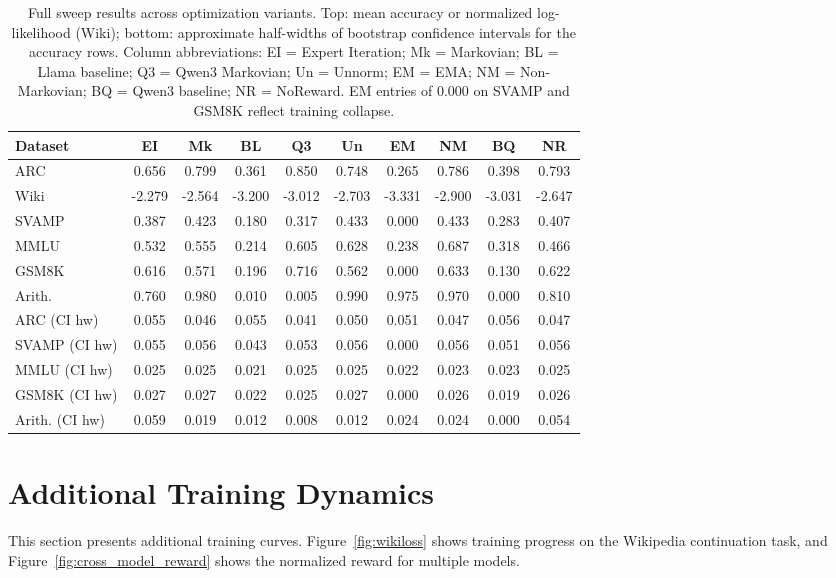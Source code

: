 \documentclass{article} %
\begin{document}
\begin{table}[ht]
    \centering
    \caption{Full sweep results across optimization variants. Top: mean accuracy or normalized log-likelihood (Wiki); bottom: approximate half-widths of bootstrap confidence intervals for the accuracy rows. Column abbreviations: EI = Expert Iteration; Mk = Markovian; BL = Llama baseline; Q3 = Qwen3 Markovian; Un = Unnorm; EM = EMA; NM = Non-Markovian; BQ = Qwen3 baseline; NR = NoReward. EM entries of 0.000 on SVAMP and GSM8K reflect training collapse.}
    \label{tab:full_sweep_results}
    \setlength{\tabcolsep}{3pt}
    \begin{tabular}{lccccccccc}
        \toprule
        \textbf{Dataset} & \textbf{EI} & \textbf{Mk} & \textbf{BL} & \textbf{Q3} & \textbf{Un} & \textbf{EM} & \textbf{NM} & \textbf{BQ} & \textbf{NR} \\
        \midrule
        ARC & 0.656 & 0.799 & 0.361 & 0.850 & 0.748 & 0.265 & 0.786 & 0.398 & 0.793 \\
        Wiki & -2.279 & -2.564 & -3.200 & -3.012 & -2.703 & -3.331 & -2.900 & -3.031 & -2.647 \\
        SVAMP & 0.387 & 0.423 & 0.180 & 0.317 & 0.433 & 0.000 & 0.433 & 0.283 & 0.407 \\
        MMLU & 0.532 & 0.555 & 0.214 & 0.605 & 0.628 & 0.238 & 0.687 & 0.318 & 0.466 \\
        GSM8K & 0.616 & 0.571 & 0.196 & 0.716 & 0.562 & 0.000 & 0.633 & 0.130 & 0.622 \\
        Arith. & 0.760 & 0.980 & 0.010 & 0.005 & 0.990 & 0.975 & 0.970 & 0.000 & 0.810 \\
        \midrule
        ARC (CI hw) & 0.055 & 0.046 & 0.055 & 0.041 & 0.050 & 0.051 & 0.047 & 0.056 & 0.047 \\
        SVAMP (CI hw) & 0.055 & 0.056 & 0.043 & 0.053 & 0.056 & 0.000 & 0.056 & 0.051 & 0.056 \\
        MMLU (CI hw) & 0.025 & 0.025 & 0.021 & 0.025 & 0.025 & 0.022 & 0.023 & 0.023 & 0.025 \\
        GSM8K (CI hw) & 0.027 & 0.027 & 0.022 & 0.025 & 0.027 & 0.000 & 0.026 & 0.019 & 0.026 \\
        Arith. (CI hw) & 0.059 & 0.019 & 0.012 & 0.008 & 0.012 & 0.024 & 0.024 & 0.000 & 0.054 \\
        \bottomrule
    \end{tabular}
\end{table}

\section{Additional Training Dynamics}
\label{app:additional_figures}
This section presents additional training curves. Figure~\ref{fig:wikiloss} shows training progress on the Wikipedia continuation task, and Figure~\ref{fig:cross_model_reward} shows the normalized reward for multiple models.
\end{document}
